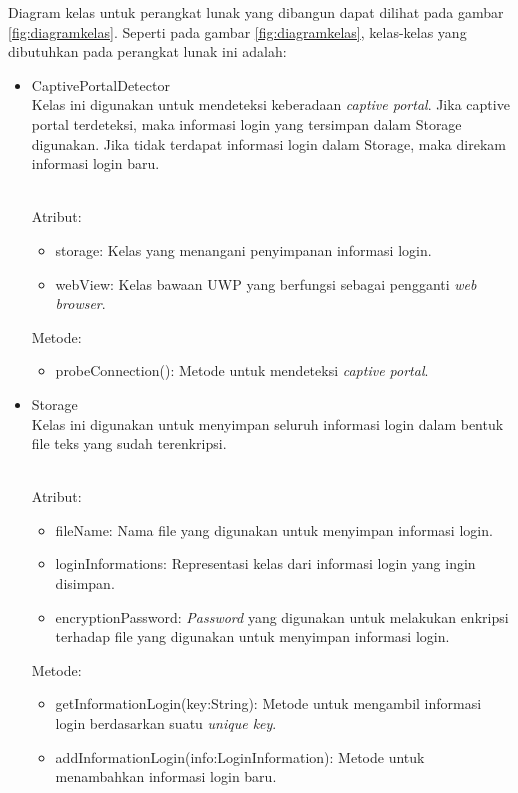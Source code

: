 Diagram kelas untuk perangkat lunak yang dibangun dapat dilihat pada gambar \ref{fig:diagramkelas}. Seperti pada gambar \ref{fig:diagramkelas}, kelas-kelas yang dibutuhkan pada perangkat lunak ini adalah:

\begin{itemize}
    \item{CaptivePortalDetector\\Kelas ini digunakan untuk mendeteksi keberadaan \textit{captive portal}. Jika captive portal terdeteksi, maka informasi login yang tersimpan dalam Storage digunakan. Jika tidak terdapat informasi login dalam Storage, maka direkam informasi login baru.}
    {
        \\Atribut:
        \begin{itemize}
            \item{storage: Kelas yang menangani penyimpanan informasi login.}
            \item{webView: Kelas bawaan UWP yang berfungsi sebagai pengganti \textit{web browser}.}
        \end{itemize}
        Metode:
        \begin{itemize}
            \item{probeConnection(): Metode untuk mendeteksi \textit{captive portal}.}
        \end{itemize}
    }
    \item{Storage\\Kelas ini digunakan untuk menyimpan seluruh informasi login dalam bentuk file teks yang sudah terenkripsi.}
    {
        \\Atribut:
        \begin{itemize}
            \item{fileName: Nama file yang digunakan untuk menyimpan informasi login.}
            \item{loginInformations: Representasi kelas dari informasi login yang ingin disimpan.}
            \item{encryptionPassword: \textit{Password} yang digunakan untuk melakukan enkripsi terhadap file yang digunakan untuk menyimpan informasi login.}
        \end{itemize}
        Metode:
        \begin{itemize}
            \item{getInformationLogin(key:String): Metode untuk mengambil informasi login berdasarkan suatu \textit{unique key}.}
            \item{addInformationLogin(info:LoginInformation): Metode untuk menambahkan informasi login baru.}

\end{itemize}}
\end{itemize}
